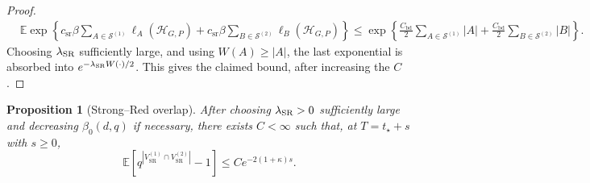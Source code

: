 \documentclass[letterpaper,11pt,reqno]{amsart}
\newtheorem{prop}[thm]{Proposition}
\theoremstyle{definition}
\begin{document}
\begin{proof}
\[\begin{aligned}
&\mathbb E
\exp\left\{
c_{\mathrm{sr}}\beta
\sum_{A\in\mathcal S^{(1)}}\ell_A(\mathcal H_{G,P})
+
c_{\mathrm{sr}}\beta
\sum_{B\in\mathcal S^{(2)}}\ell_B(\mathcal H_{G,P})
\right\}                               \le
        \exp\left\{
        \frac{C_{\mathrm{bd}}}{2}
        \sum_{A\in\mathcal S^{(1)}}|A|
        +
        \frac{C_{\mathrm{bd}}}{2}
        \sum_{B\in\mathcal S^{(2)}}|B|
        \right\}.
\end{aligned}
\]
Choosing \(\lambda_{\rm SR}\) sufficiently large, and using \(W(A)\ge |A|\), the last
exponential is absorbed into
\(e^{-\lambda_{\rm SR} W(\cdot)/2}\).  This gives the claimed bound, after increasing
the $C$.
\end{proof}





\begin{prop}[Strong--Red overlap]
\label{prop:strong-red-overlap}
After choosing \(\lambda_{\rm SR}>0\) sufficiently large and decreasing
\(\beta_0(d,q)\) if necessary, there exists \(C<\infty\) such that, at
\(T=t_\star+s\) with \(s\ge0\),
\[
        \mathbb E\left[
        q^{|V_{\mathrm{SR}}^{(1)}\cap V_{\mathrm{SR}}^{(2)}|}-1
        \right]
        \le
        C e^{-2(1+\kappa)s}.
\]
\end{prop}
\end{document}
